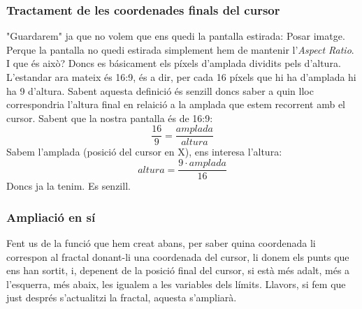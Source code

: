 \subsubsection{Tractament de les coordenades finals del cursor}
"Guardarem" ja que no volem que ens quedi la pantalla estirada: \n
Posar imatge. \n
Perque la pantalla no quedi estirada simplement hem de mantenir l'\emph{Aspect Ratio}. I que és això? Doncs es básicament els píxels d'amplada dividits pels d'altura. L'estandar ara mateix és 16:9, és a dir, per cada 16 píxels que hi ha d'amplada hi ha 9 d'altura. Sabent aquesta definició és senzill doncs saber a quin lloc correspondria l'altura final en relaició a la amplada que estem recorrent amb el cursor. \n
Sabent que la nostra pantalla és de 16:9:
\[\frac{16}{9} = \frac{amplada}{altura}\]
Sabem l'amplada (posició del cursor en X), ens interesa l'altura:
\[altura = \frac{9 \cdot amplada}{16}\]
Doncs ja la tenim. Es senzill.
\subsubsection{Ampliació en sí}
Fent us de la funció que hem creat abans, per saber quina coordenada li correspon al fractal donant-li una coordenada del cursor, li donem els punts que ens han sortit, i, depenent de la posició final del cursor, si està més adalt, més a l'esquerra, més abaix, les igualem a les variables dels límits. \n
Llavors, si fem que just després s'actualitzi la fractal, aquesta s'ampliarà.
